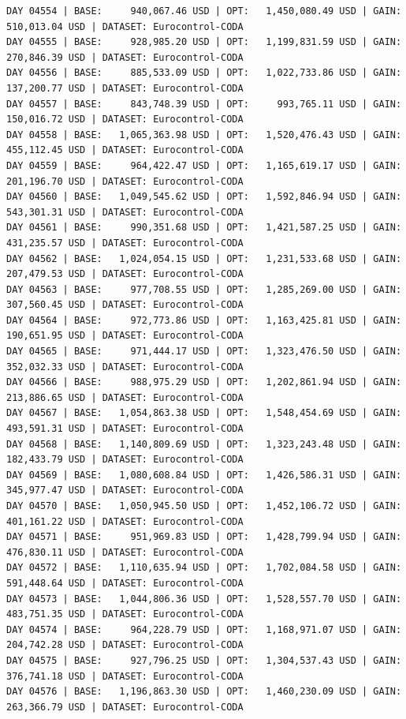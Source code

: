\documentclass[11pt,a4paper]{article}
\begin{document}
\begin{verbatim}
DAY 04554 | BASE:     940,067.46 USD | OPT:   1,450,080.49 USD | GAIN: 510,013.04 USD | DATASET: Eurocontrol-CODA
DAY 04555 | BASE:     928,985.20 USD | OPT:   1,199,831.59 USD | GAIN: 270,846.39 USD | DATASET: Eurocontrol-CODA
DAY 04556 | BASE:     885,533.09 USD | OPT:   1,022,733.86 USD | GAIN: 137,200.77 USD | DATASET: Eurocontrol-CODA
DAY 04557 | BASE:     843,748.39 USD | OPT:     993,765.11 USD | GAIN: 150,016.72 USD | DATASET: Eurocontrol-CODA
DAY 04558 | BASE:   1,065,363.98 USD | OPT:   1,520,476.43 USD | GAIN: 455,112.45 USD | DATASET: Eurocontrol-CODA
DAY 04559 | BASE:     964,422.47 USD | OPT:   1,165,619.17 USD | GAIN: 201,196.70 USD | DATASET: Eurocontrol-CODA
DAY 04560 | BASE:   1,049,545.62 USD | OPT:   1,592,846.94 USD | GAIN: 543,301.31 USD | DATASET: Eurocontrol-CODA
DAY 04561 | BASE:     990,351.68 USD | OPT:   1,421,587.25 USD | GAIN: 431,235.57 USD | DATASET: Eurocontrol-CODA
DAY 04562 | BASE:   1,024,054.15 USD | OPT:   1,231,533.68 USD | GAIN: 207,479.53 USD | DATASET: Eurocontrol-CODA
DAY 04563 | BASE:     977,708.55 USD | OPT:   1,285,269.00 USD | GAIN: 307,560.45 USD | DATASET: Eurocontrol-CODA
DAY 04564 | BASE:     972,773.86 USD | OPT:   1,163,425.81 USD | GAIN: 190,651.95 USD | DATASET: Eurocontrol-CODA
DAY 04565 | BASE:     971,444.17 USD | OPT:   1,323,476.50 USD | GAIN: 352,032.33 USD | DATASET: Eurocontrol-CODA
DAY 04566 | BASE:     988,975.29 USD | OPT:   1,202,861.94 USD | GAIN: 213,886.65 USD | DATASET: Eurocontrol-CODA
DAY 04567 | BASE:   1,054,863.38 USD | OPT:   1,548,454.69 USD | GAIN: 493,591.31 USD | DATASET: Eurocontrol-CODA
DAY 04568 | BASE:   1,140,809.69 USD | OPT:   1,323,243.48 USD | GAIN: 182,433.79 USD | DATASET: Eurocontrol-CODA
DAY 04569 | BASE:   1,080,608.84 USD | OPT:   1,426,586.31 USD | GAIN: 345,977.47 USD | DATASET: Eurocontrol-CODA
DAY 04570 | BASE:   1,050,945.50 USD | OPT:   1,452,106.72 USD | GAIN: 401,161.22 USD | DATASET: Eurocontrol-CODA
DAY 04571 | BASE:     951,969.83 USD | OPT:   1,428,799.94 USD | GAIN: 476,830.11 USD | DATASET: Eurocontrol-CODA
DAY 04572 | BASE:   1,110,635.94 USD | OPT:   1,702,084.58 USD | GAIN: 591,448.64 USD | DATASET: Eurocontrol-CODA
DAY 04573 | BASE:   1,044,806.36 USD | OPT:   1,528,557.70 USD | GAIN: 483,751.35 USD | DATASET: Eurocontrol-CODA
DAY 04574 | BASE:     964,228.79 USD | OPT:   1,168,971.07 USD | GAIN: 204,742.28 USD | DATASET: Eurocontrol-CODA
DAY 04575 | BASE:     927,796.25 USD | OPT:   1,304,537.43 USD | GAIN: 376,741.18 USD | DATASET: Eurocontrol-CODA
DAY 04576 | BASE:   1,196,863.30 USD | OPT:   1,460,230.09 USD | GAIN: 263,366.79 USD | DATASET: Eurocontrol-CODA

\end{verbatim}
\end{document}
